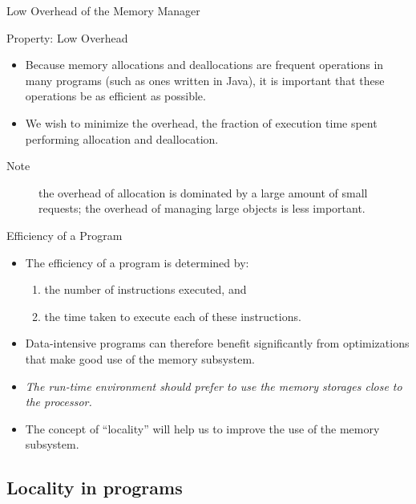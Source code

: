 \begin{bibunit}[apalike]
\begin{frame}{Low Overhead of the Memory Manager}
	\begin{block}{Property: Low Overhead}
		\begin{itemize}
		\item Because memory allocations and deallocations are frequent operations in many programs (such as ones written in Java), it is important that these operations be as efficient as possible.
		\item We wish to minimize the overhead, the fraction of execution time spent performing allocation and deallocation.
		\end{itemize}
	\end{block}
	\vspace{1em}
	\begin{description}
	\item[Note] the overhead of allocation is dominated by a large amount of small requests; the overhead of managing large objects is less important.
	\end{description}
\end{frame}

\begin{frame}{Efficiency of a Program}
	\begin{itemize}
	\item The efficiency of a program is determined by:
		\begin{enumerate}
		\item the number of instructions executed, and
		\item the time taken to execute each of these instructions.
		\end{enumerate}
	\vfill
	\item Data-intensive programs can therefore benefit significantly from optimizations that make good use of the memory subsystem.
	\vfill
	\item \emph{The run-time environment should prefer to use the memory storages close to the processor.}
	\vfill
	\item The concept of ``locality'' will help us to improve the use of the memory subsystem.
	\end{itemize}
\end{frame}

\subsection{Locality in programs}

\tableofcontentslide[sections={1-5},sectionstyle={show/shaded},subsectionstyle={show/shaded/hide},subsubsectionstyle={hide/hide/hide/hide}]


\end{bibunit}
